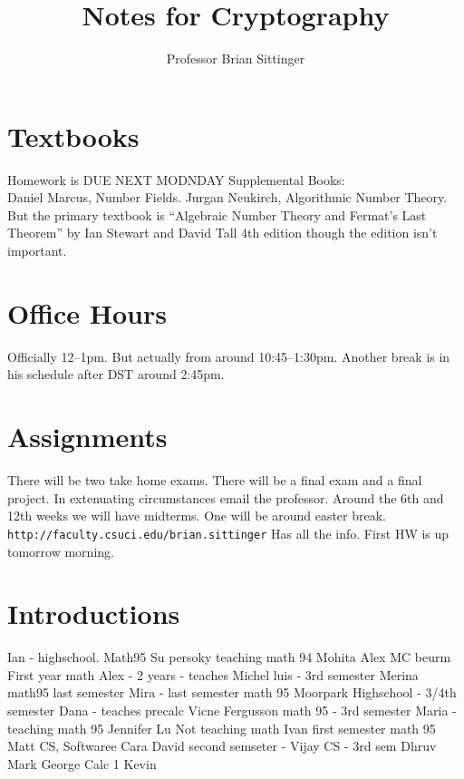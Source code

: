 \documentclass{article}
\title{Notes for Cryptography}
\author{Professor Brian Sittinger}
\date{}
\begin{document}
\maketitle
\section{Textbooks}
Homework is DUE NEXT MODNDAY
Supplemental Books:\\
Daniel Marcus, Number Fields. Jurgan Neukirch, Algorithmic Number Theory. \\
But the primary textbook is ``Algebraic Number Theory and Fermat's Last Theorem'' by 
Ian Stewart and David Tall 4th edition though the edition isn't important. 

\section{Office Hours}
Officially 12--1pm. But actually from around 10:45--1:30pm. Another break is in
his schedule after DST around 2:45pm. 

\section{Assignments}
There will be two take home exams. There will be a final exam and a final
project. In extenuating circumstances email the professor. Around the 6th and
12th weeks we will have midterms. One will be around easter break.
\texttt{http://faculty.csuci.edu/brian.sittinger} Has all the info. First HW
is up tomorrow morning. 

\section{Introductions}
Ian - highschool.
Math95
Su persoky teaching math 94
Mohita
Alex MC beurm First year math
Alex - 2 years - teaches
Michel luis - 3rd semester
Merina math95 last semester
Mira - last semester math 95
Moorpark Highschool - 3/4th semester
Dana - teaches precalc 
Vicne Fergusson math 95 - 3rd semester
Maria - teaching math 95
Jennifer Lu Not teaching math 
Ivan first semester math 95
Matt CS, Softwaree
Cara
David second semseter - 
Vijay CS - 3rd sem
Dhruv 
Mark
George Calc 1
Kevin 
\end{document}
